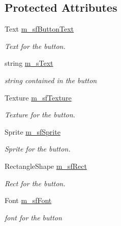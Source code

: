 \subsection*{Protected Attributes}
\begin{DoxyCompactItemize}
\item 
\hypertarget{class_button_a353afe3c7c8186bcb6a322d2aa4ab9bc}{}\label{class_button_a353afe3c7c8186bcb6a322d2aa4ab9bc} 
Text \hyperlink{class_button_a353afe3c7c8186bcb6a322d2aa4ab9bc}{m\+\_\+sf\+Button\+Text}
\begin{DoxyCompactList}\small\item\em Text for the button. \end{DoxyCompactList}\item 
\hypertarget{class_button_ab666db59cd6c0d4f281e07d79562ba99}{}\label{class_button_ab666db59cd6c0d4f281e07d79562ba99} 
string \hyperlink{class_button_ab666db59cd6c0d4f281e07d79562ba99}{m\+\_\+s\+Text}
\begin{DoxyCompactList}\small\item\em string contained in the button \end{DoxyCompactList}\item 
\hypertarget{class_button_ac53295dae71348a617af3661b72d39b4}{}\label{class_button_ac53295dae71348a617af3661b72d39b4} 
Texture \hyperlink{class_button_ac53295dae71348a617af3661b72d39b4}{m\+\_\+sf\+Texture}
\begin{DoxyCompactList}\small\item\em Texture for the button. \end{DoxyCompactList}\item 
\hypertarget{class_button_ac8a8b7fa5c8d060205c496ca4610ae25}{}\label{class_button_ac8a8b7fa5c8d060205c496ca4610ae25} 
Sprite \hyperlink{class_button_ac8a8b7fa5c8d060205c496ca4610ae25}{m\+\_\+sf\+Sprite}
\begin{DoxyCompactList}\small\item\em Sprite for the button. \end{DoxyCompactList}\item 
\hypertarget{class_button_a823024f8726bba17b9b092084181d9b7}{}\label{class_button_a823024f8726bba17b9b092084181d9b7} 
Rectangle\+Shape \hyperlink{class_button_a823024f8726bba17b9b092084181d9b7}{m\+\_\+sf\+Rect}
\begin{DoxyCompactList}\small\item\em Rect for the button. \end{DoxyCompactList}\item 
\hypertarget{class_button_a2c351b83dc0d860afc63c015ba598790}{}\label{class_button_a2c351b83dc0d860afc63c015ba598790} 
Font \hyperlink{class_button_a2c351b83dc0d860afc63c015ba598790}{m\+\_\+sf\+Font}
\begin{DoxyCompactList}\small\item\em font for the button \end{DoxyCompactList}\end{DoxyCompactItemize}


